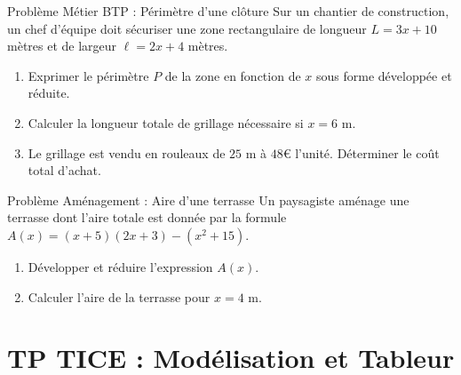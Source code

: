 \begin{exercice}[3 pts]{\capAnalyser}{Problème Métier BTP : Périmètre d'une clôture}
Sur un chantier de construction, un chef d'équipe doit sécuriser une zone rectangulaire de longueur $L = 3x + 10$ mètres et de largeur $\ell = 2x + 4$ mètres.
\begin{enumerate}
    \item Exprimer le périmètre $P$ de la zone en fonction de $x$ sous forme développée et réduite.
    \item Calculer la longueur totale de grillage nécessaire si $x = 6\text{ m}$.
    \item Le grillage est vendu en rouleaux de $25\text{ m}$ à $48\euro$ l'unité. Déterminer le coût total d'achat.
\end{enumerate}
\lignesreponse[6]
\end{exercice}

\begin{exercice}[3 pts]{\capAnalyser}{Problème Aménagement : Aire d'une terrasse}
Un paysagiste aménage une terrasse dont l'aire totale est donnée par la formule $A(x) = (x + 5)(2x + 3) - (x^2 + 15)$.
\begin{enumerate}
    \item Développer et réduire l'expression $A(x)$.
    \item Calculer l'aire de la terrasse pour $x = 4\text{ m}$.
\end{enumerate}
\lignesreponse[5]
\end{exercice}

\section{TP TICE : Modélisation et Tableur}

